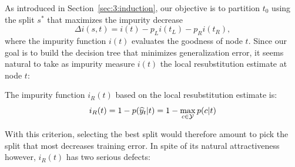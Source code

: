 As introduced in Section~\ref{sec:3:induction}, our objective is to partition
$t_0$ using the split $s^*$ that maximizes the impurity decrease $$\Delta i(s,
t) = i(t) - p_L i(t_L) - p_R i(t_R),$$ where the impurity function $i(t)$ evaluates
the goodness of node $t$. Since our goal is to build the decision tree
that minimizes generalization error, it seems natural to take as impurity
measure $i(t)$ the local resubstitution estimate at node $t$:
\begin{definition}
The impurity function $i_R(t)$ based on the local resubstitution estimate
is:
\begin{equation}\label{eqn:impurity:error}
i_R(t) = 1 - p(\widehat{y}_t|t) =  1 - \max_{c \in {\cal Y}} p(c|t)
\end{equation}
\end{definition}
With this criterion, selecting the best split would therefore amount to pick the split that most
decreases training error. In spite of its natural attractiveness however,
$i_R(t)$ has two serious defects:
